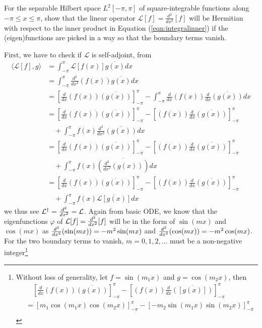 \begin{exmp}
\label{exmp:Fourierbasis}
For the separable Hilbert space $L^2[-\pi, \pi]$ of square-integrable functions along $-\pi \leq x \leq \pi$, show that the linear operator $\mathcal{L}[f] = \frac{d^2}{dx^2}[f]$ will be Hermitian with respect to the inner product in Equation (\ref{eqn:integralinner}) if the (eigen)functions are picked in a way so that the boundary terms vanish.
\end{exmp}
\begin{solution}
First, we have to check if $\mathcal{L}$ is self-adjoint, from
\begin{align*}
\langle \mathcal{L}[f], g \rangle &= \int_{-\pi}^\pi \mathcal{L}[f(x)] \overline{g(x)} dx \\
&= \int_{-\pi}^\pi \frac{d^2}{dx^2}(f(x)) \overline{g(x)} dx \\
&= [\frac{d}{dx}(f(x)) \overline{(g(x))}]_{-\pi}^\pi - \int_{-\pi}^\pi \frac{d}{dx}(f(x)) \frac{d}{dx}\overline{(g(x))} dx \\
&= [\frac{d}{dx}(f(x)) \overline{(g(x))}]_{-\pi}^\pi - [(f(x)) \frac{d}{dx}\overline{(g(x))}]_{-\pi}^\pi \\
&\quad + \int_{-\pi}^\pi f(x) \frac{d^2}{dx^2}\overline{(g(x))} dx \\
&= [\frac{d}{dx}(f(x)) \overline{(g(x))}]_{-\pi}^\pi - [(f(x)) \frac{d}{dx}\overline{(g(x))}]_{-\pi}^\pi \\
&\quad + \int_{-\pi}^\pi f(x) \overline{\left(\frac{d^2}{dx^2}(g(x))\right)} dx \\
&= [\frac{d}{dx}(f(x)) \overline{(g(x))}]_{-\pi}^\pi - [(f(x)) \frac{d}{dx}\overline{(g(x))}]_{-\pi}^\pi \\
&\quad + \int_{-\pi}^\pi f(x) \overline{\mathcal{L}[g(x)]} dx
\end{align*}
we thus see $\mathcal{L}^\dag = \smash{\frac{d^2}{dx^2}} = \mathcal{L}$. Again from basic ODE, we know that the eigenfunctions $\varphi$ of $\mathcal{L}[f] = \smash{\frac{d^2}{dx^2}[f]}$ will be in the form of $\sin(mx)$ and $\cos(mx)$ as $\smash{\frac{d^2}{dx^2}}(\sin(mx)) = -m^2\sin(mx)$ and $\smash{\frac{d^2}{dx^2}}(\cos(mx)) = -m^2\cos(mx)$. For the two boundary terms to vanish, $m = 0, 1, 2, \ldots$ must be a non-negative integer\footnote{Without loss of generality, let $f = \sin(m_1 x)$ and $g = \cos(m_2 x)$, then
\begin{align*}
&\quad [\frac{d}{dx}(f(x)) \overline{(g(x))}]_{-\pi}^\pi - [(f(x)) \frac{d}{dx}\overline{([g(x)])}]_{-\pi}^\pi \\
&= [m_1\cos(m_1 x)\cos(m_2 x)]_{-\pi}^\pi - [-m_2\sin(m_1 x)\sin(m_2 x)]_{-\pi}^\pi \\

\end{align*}}
\end{solution}
